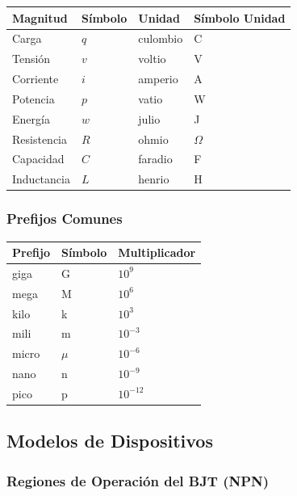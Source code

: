 \documentclass[11pt,a4paper]{article}
\begin{document}
\begin{center}
\begin{tabular}{@{}llll@{}}
\toprule
Magnitud & Símbolo & Unidad & Símbolo Unidad \\
\midrule
Carga & $q$ & culombio & C \\
Tensión & $v$ & voltio & V \\
Corriente & $i$ & amperio & A \\
Potencia & $p$ & vatio & W \\
Energía & $w$ & julio & J \\
Resistencia & $R$ & ohmio & $\Omega$ \\
Capacidad & $C$ & faradio & F \\
Inductancia & $L$ & henrio & H \\
\bottomrule
\end{tabular}
\end{center}



\subsubsection*{Prefijos Comunes}


\begin{center}
\begin{tabular}{@{}lll@{}}
\toprule
Prefijo & Símbolo & Multiplicador \\
\midrule
giga & G & $10^9$ \\
mega & M & $10^6$ \\
kilo & k & $10^3$ \\
mili & m & $10^{-3}$ \\
micro & $\mu$ & $10^{-6}$ \\
nano & n & $10^{-9}$ \\
pico & p & $10^{-12}$ \\
\bottomrule
\end{tabular}
\end{center}



\subsection*{Modelos de Dispositivos}


\subsubsection*{Regiones de Operación del BJT (NPN)}
\end{document}
